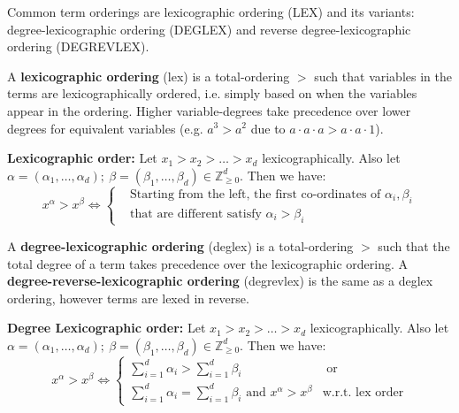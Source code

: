 Common term orderings are lexicographic ordering (LEX) and its variants: 
degree-lexicographic ordering (DEGLEX) and reverse degree-lexicographic ordering (DEGREVLEX).

A {\bf lexicographic ordering} (lex) is a total-ordering $>$ such that 
variables in the terms are lexicographically ordered, i.e. simply based on 
when the variables appear in the ordering.
Higher variable-degrees take 
precedence over lower degrees for equivalent variables (e.g. $a^3 > a^2$ due to $a \cdot a \cdot a > a \cdot a \cdot 1$).
\begin{Definition}
{\bf Lexicographic order:} Let $x_1 > x_2 > \dots > x_d$
lexicographically. Also let $\alpha = (\alpha_1, \dots, \alpha_d);
~\beta = (\beta_1, \dots, \beta_d) \in \mathbb{Z}^d_{\geq 0}$. Then we
have: 
\begin{equation}
x^{\alpha} > x^{\beta} \iff 
\begin{cases}
& \text{Starting  from the  left, the first co-ordinates of $\alpha_i, \beta_i$} \\
& \text{that are different satisfy $\alpha_i > \beta_i$}

\end{cases}
\end{equation}
\end{Definition}

A {\bf degree-lexicographic ordering} (deglex) is a total-ordering $>$ such 
that the total degree of a term takes precedence over the lexicographic 
ordering.  
A {\bf degree-reverse-lexicographic ordering} (degrevlex) is the same as a
deglex ordering, however terms are lexed in reverse.

\begin{Definition}
{\bf Degree Lexicographic order:} Let $x_1 > x_2 > \dots > x_d$
lexicographically. Also let $\alpha = (\alpha_1, \dots, \alpha_d);
~\beta = (\beta_1, \dots, \beta_d) \in \mathbb{Z}^d_{\geq 0}$. Then we
have: 
\begin{equation}
x^{\alpha} > x^{\beta} \iff 
\begin{cases}
\sum_{i=1}^{d}\alpha_i > \sum_{i=1}^{d} \beta_i & \text{ or }\\
\sum_{i=1}^{d}\alpha_i = \sum_{i=1}^{d} \beta_i  \text{ and }
x^{\alpha} > x^{\beta} & \text{w.r.t. lex order}
\end{cases}
\end{equation}
\end{Definition}


